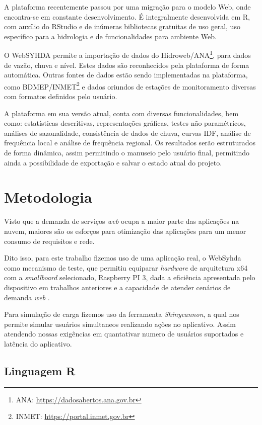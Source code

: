 \documentclass[12pt,english,brazil]{article}
\begin{document}
A plataforma recentemente passou por uma migração para o modelo Web, onde encontra-se em constante desenvolvimento. É integralmente desenvolvida em R, com auxílio do RStudio e de inúmeras bibliotecas gratuitas de uso geral, uso específico para a hidrologia e de funcionalidades para ambiente Web. %

O WebSYHDA permite a importação de dados do Hidroweb/ANA\footnote{ANA: \url{https://dadosabertos.ana.gov.br}}, para dados de vazão, chuva e nível. Estes dados são reconhecidos pela plataforma de forma automática. Outras fontes de dados estão sendo implementadas na plataforma, como BDMEP/INMET\footnote{INMET: \url{https://portal.inmet.gov.br}} e dados oriundos de estações de monitoramento diversas com formatos definidos pelo usuário.

A plataforma em sua versão atual, conta com diversas funcionalidades, bem como: estatísticas descritivas, representações gráficas, testes não paramétricos, análises de sazonalidade, consistência de dados de chuva, curvas IDF, análise de frequência local e análise de frequência regional. Os resultados serão estruturados de forma dinâmica, assim permitindo o manuseio pelo usuário final, permitindo ainda a possibilidade de exportação e salvar o estado atual do projeto. 

\section{Metodologia} \label{sec:metodologia}

Visto que a demanda de serviços \textit{web} ocupa a maior parte das aplicações na nuvem, maiores são os esforços para otimização das aplicações para um menor consumo de requisitos e rede. 

Dito isso, para este trabalho fizemos uso de uma aplicação real, o WebSyhda como mecanismo de teste, que permitiu equiparar \emph{hardware} de arquitetura x64 com a \emph{smallboard} selecionado, Raspberry PI 3, dada a eficiência apresentada pelo dispositivo em trabalhos anteriores e a capacidade de atender cenários de demanda \emph{web} \cite{silva2019estudo}.

Para simulação de carga fizemos uso da ferramenta \emph{Shinycannon}, a qual nos permite simular usuários simultaneos realizando ações no aplicativo. Assim atendendo nossas exigências em quantativar numero de usuários suportados e latência do aplicativo.



\subsection{Linguagem R} \label{sec:R}
\end{document}
